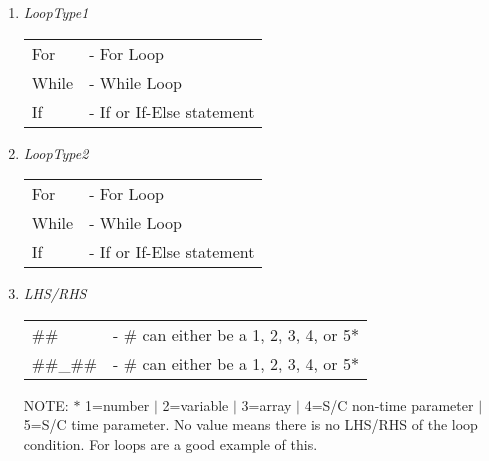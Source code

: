 \begin{enumerate}
  \item \emph{LoopType1}

  \begin{tabular}{ll}
    For  & - For Loop\\
    While   & - While Loop\\
    If & - If or If-Else statement\\
  \end{tabular}

  \item \emph{LoopType2}

  \begin{tabular}{ll}
    For  & - For Loop\\
    While   & - While Loop\\
    If & - If or If-Else statement\\
  \end{tabular}

  \item \emph{LHS/RHS}

  \begin{tabular}{ll}
    \#\# & - \# can either be a 1, 2, 3, 4, or 5$*$\\
    \#\#\_\#\# & - \# can either be a 1, 2, 3, 4, or 5$*$\\
  \end{tabular}

  NOTE:  $*$ 1=number $|$ 2=variable $|$ 3=array $|$ 4=S/C non-time parameter $|$ 5=S/C time
  parameter. No value means there is no LHS/RHS of the loop condition. For loops are a good example of this.
\end{enumerate}
